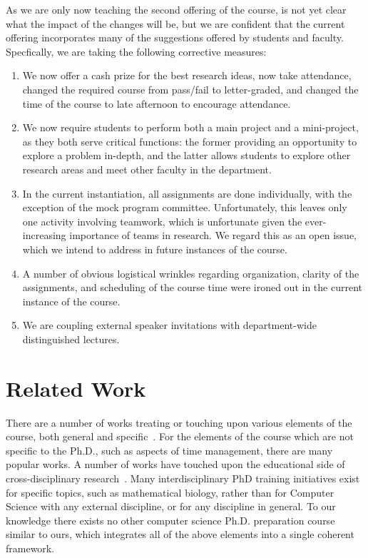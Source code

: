 As we are only now teaching the second offering of the course, is not
yet clear what the impact of the changes will be, but we are confident
that the current offering incorporates many of the suggestions offered
by students and faculty.  Specfically, we are taking the following
corrective measures:
\begin{enumerate}
\itemsep=-1pt
\item We now offer a cash prize for the best research ideas, now take
attendance, changed the required course from pass/fail to letter-graded,
and changed the time of the course to late afternoon to encourage
attendance.
\item We now require students to perform both a main project and a
mini-project, as they both serve critical functions: the former
providing an opportunity to explore a problem in-depth, and the latter
allows students to explore other research areas and meet other faculty
in the department.
\item In the current instantiation, all assignments are done individually,
with the exception of the mock program committee.  Unfortunately, this
leaves only one activity involving teamwork, which is unfortunate given
the ever-increasing importance of teams in research.  We regard this as
an open issue, which we intend to address in future instances of the
course.
\item A number of obvious logistical wrinkles regarding organization, clarity
of the assignments, and scheduling of the course time were ironed out in
the current instance of the course.
\item We are coupling external speaker invitations with department-wide
distinguished lectures.
\end{enumerate}

\section{Related Work}\label{sec:related}

There are a number of works treating or touching upon various elements
of the course, both general and
specific~\cite{phd-not-enough,reshaping-grad-educ,grad-school-survival,
  unwritten-rules,art-sci-investigation,creativity-in-science,res-students-guide}.
For the elements of the course which are not specific to the Ph.D., such
as aspects of time management, there are many popular works.  A number
of works have touched upon the educational side of cross-disciplinary
research~\cite{work-at-boundaries,facilitating-interdisc,
  grand-unif-interdisc,discourse-anal-cross-disc}.  Many
interdisciplinary PhD training initiatives exist for specific topics,
such as mathematical biology, rather than for Computer Science with any
external discipline, or for any discipline in general.  To our knowledge
there exists no other computer science Ph.D. preparation course similar
to ours, which integrates all of the above elements into a single
coherent framework.

